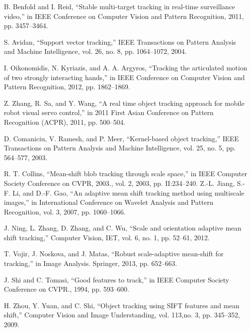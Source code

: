 \documentclass[paper=a4, fontsize=12pt]{article} %
\begin{document}
\begin{thebibliography}{9}

\begin{LTRitems}
\resetlatinfont

B. Benfold and I. Reid, “Stable multi-target tracking in real-time surveillance video,” in IEEE Conference on Computer Vision and Pattern Recognition, 2011, pp. 3457–3464.

S. Avidan, “Support vector tracking,” IEEE Transactions on Pattern Analysis and Machine Intelligence, vol. 26, no. 8, pp. 1064–1072, 2004.

I. Oikonomidis, N. Kyriazis, and A. A. Argyros, “Tracking the articulated motion of two strongly interacting hands,” in IEEE Conference on Computer Vision and Pattern Recognition, 2012, pp. 1862–1869.

Z. Zhang, R. Sa, and Y. Wang, “A real time object tracking approach for mobile robot visual servo control,” in 2011 First Asian Conference on Pattern Recognition (ACPR), 2011, pp. 500–504.

D. Comaniciu, V. Ramesh, and P. Meer, “Kernel-based object tracking,” IEEE Transactions on Pattern Analysis and Machine Intelligence, vol. 25, no. 5, pp. 564–577, 2003.

R. T. Collins, “Mean-shift blob tracking through scale space,” in IEEE Computer Society Conference on CVPR, 2003., vol. 2, 2003, pp. II:234–240.
Z.-L. Jiang, S.-F. Li, and D.-F. Gao, “An adaptive mean shift tracking method using multiscale images,” in International Conference on Wavelet Analysis and Pattern Recognition, vol. 3, 2007, pp. 1060–1066.

J. Ning, L. Zhang, D. Zhang, and C. Wu, “Scale and orientation adaptive mean shift tracking,” Computer Vision, IET, vol. 6, no. 1, pp. 52–61, 2012.

T. Vojir, J. Noskova, and J. Matas, “Robust scale-adaptive mean-shift for tracking,” in Image Analysis. Springer, 2013, pp. 652–663.

J. Shi and C. Tomasi, “Good features to track,” in IEEE Computer Society Conference on CVPR., 1994, pp. 593–600.

H. Zhou, Y. Yuan, and C. Shi, “Object tracking using SIFT features and mean shift,” Computer Vision and Image Understanding, vol. 113,no. 3, pp. 345–352, 2009.


\end{LTRitems}
\end{thebibliography}
\end{document}
